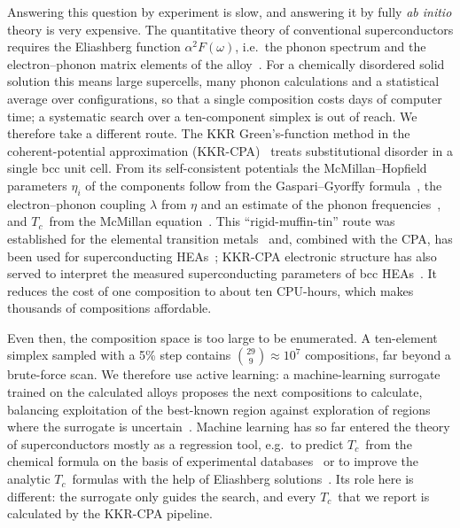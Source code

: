 \documentclass[aps,prb,reprint,superscriptaddress,twocolumn,floatfix]{revtex4-2}
\newcommand{\Tc}{$T_c$}
\begin{document}
Answering this question by experiment is slow, and answering it by fully \emph{ab initio}
theory is very expensive. The quantitative theory of conventional superconductors requires the
Eliashberg function $\alpha^2F(\omega)$, i.e.\ the phonon spectrum and the electron--phonon
matrix elements of the alloy~\cite{Giustino2017,Baroni2001}. For a chemically disordered
solid solution this means large supercells, many phonon calculations and a statistical
average over configurations, so that a single composition costs days of computer time; a
systematic search over a ten-component simplex is out of reach. We therefore take a different
route. The KKR Green's-function method in the coherent-potential approximation
(KKR-CPA)~\cite{Korringa1947,KohnRostoker1954,Soven1967,Akai1989} treats substitutional
disorder in a single bcc unit cell. From its self-consistent potentials the McMillan--Hopfield
parameters $\eta_i$ of the components follow from the Gaspari--Gyorffy
formula~\cite{GaspariGyorffy1972,Papaconstantopoulos1977}, the electron--phonon coupling
$\lambda$ from $\eta$ and an estimate of the phonon frequencies~\cite{Hopfield1969}, and
\Tc\ from the McMillan equation~\cite{McMillan1968,AllenDynes1975}. This ``rigid-muffin-tin''
route was established for the elemental transition
metals~\cite{Papaconstantopoulos1977,Butler1977} and, combined with the CPA, has been used
for superconducting HEAs~\cite{Jaskiewicz2016,Jaskiewicz2019}; KKR-CPA electronic structure
has also served to interpret the measured superconducting parameters of bcc
HEAs~\cite{lit_Sobota_06184512,lit_Idczak_16175814,lit_Idczak_fnz7bzmw}. It reduces the
cost of one composition to about ten CPU-hours, which makes thousands of compositions
affordable.

Even then, the composition space is too large to be enumerated. A ten-element simplex sampled
with a 5\% step contains $\binom{29}{9} \approx 10^7$ compositions, far beyond a brute-force
scan. We therefore use active learning: a machine-learning surrogate trained on the calculated
alloys proposes the next compositions to calculate, balancing exploitation of the
best-known region against exploration of regions where the surrogate is
uncertain~\cite{Srinivas2010,Lakshminarayanan2017}. Machine learning has so far
entered the theory of superconductors mostly as a regression tool, e.g.\ to predict \Tc\ from
the chemical formula on the basis of experimental databases~\cite{Stanev2018} or to improve
the analytic \Tc\ formulas with the help of Eliashberg solutions~\cite{Xie2022}. Its role here
is different: the surrogate only guides the search, and every \Tc\ that we report is
calculated by the KKR-CPA pipeline.
\end{document}
